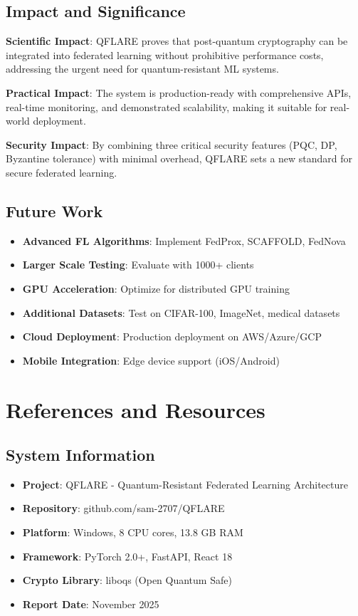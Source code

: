 \documentclass[12pt,a4paper]{article}
\begin{document}
\subsection{Impact and Significance}

\textbf{Scientific Impact}: QFLARE proves that post-quantum cryptography can be integrated into federated learning without prohibitive performance costs, addressing the urgent need for quantum-resistant ML systems.

\textbf{Practical Impact}: The system is production-ready with comprehensive APIs, real-time monitoring, and demonstrated scalability, making it suitable for real-world deployment.

\textbf{Security Impact}: By combining three critical security features (PQC, DP, Byzantine tolerance) with minimal overhead, QFLARE sets a new standard for secure federated learning.

\subsection{Future Work}

\begin{itemize}
    \item \textbf{Advanced FL Algorithms}: Implement FedProx, SCAFFOLD, FedNova
    \item \textbf{Larger Scale Testing}: Evaluate with 1000+ clients
    \item \textbf{GPU Acceleration}: Optimize for distributed GPU training
    \item \textbf{Additional Datasets}: Test on CIFAR-100, ImageNet, medical datasets
    \item \textbf{Cloud Deployment}: Production deployment on AWS/Azure/GCP
    \item \textbf{Mobile Integration}: Edge device support (iOS/Android)
\end{itemize}

\section{References and Resources}

\subsection{System Information}

\begin{itemize}
    \item \textbf{Project}: QFLARE - Quantum-Resistant Federated Learning Architecture
    \item \textbf{Repository}: github.com/sam-2707/QFLARE
    \item \textbf{Platform}: Windows, 8 CPU cores, 13.8 GB RAM
    \item \textbf{Framework}: PyTorch 2.0+, FastAPI, React 18
    \item \textbf{Crypto Library}: liboqs (Open Quantum Safe)
    \item \textbf{Report Date}: November 2025
\end{itemize}
\end{document}
